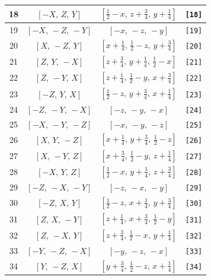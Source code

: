\documentclass[fleqn,8pt]{jsarticle}
\begin{document}
\begin{longtable}{cccc}
18 & $\left[ - X,\, Z,\, Y \right]$ & $\left[ \frac{1}{2} - x,\, z + \frac{3}{4},\, y + \frac{1}{4} \right]$ & {\tt [18]} \\ \hline
19 & $\left[ - X,\, - Z,\, - Y \right]$ & $\left[ - x,\, - z,\, - y \right]$ & {\tt [19]} \\ \hline
20 & $\left[ X,\, - Z,\, Y \right]$ & $\left[ x + \frac{1}{4},\, \frac{1}{2} - z,\, y + \frac{3}{4} \right]$ & {\tt [20]} \\ \hline
21 & $\left[ Z,\, Y,\, - X \right]$ & $\left[ z + \frac{3}{4},\, y + \frac{1}{4},\, \frac{1}{2} - x \right]$ & {\tt [21]} \\ \hline
22 & $\left[ Z,\, - Y,\, X \right]$ & $\left[ z + \frac{1}{4},\, \frac{1}{2} - y,\, x + \frac{3}{4} \right]$ & {\tt [22]} \\ \hline
23 & $\left[ - Z,\, Y,\, X \right]$ & $\left[ \frac{1}{2} - z,\, y + \frac{3}{4},\, x + \frac{1}{4} \right]$ & {\tt [23]} \\ \hline
24 & $\left[ - Z,\, - Y,\, - X \right]$ & $\left[ - z,\, - y,\, - x \right]$ & {\tt [24]} \\ \hline
25 & $\left[ - X,\, - Y,\, - Z \right]$ & $\left[ - x,\, - y,\, - z \right]$ & {\tt [25]} \\ \hline
26 & $\left[ X,\, Y,\, - Z \right]$ & $\left[ x + \frac{1}{4},\, y + \frac{3}{4},\, \frac{1}{2} - z \right]$ & {\tt [26]} \\ \hline
27 & $\left[ X,\, - Y,\, Z \right]$ & $\left[ x + \frac{3}{4},\, \frac{1}{2} - y,\, z + \frac{1}{4} \right]$ & {\tt [27]} \\ \hline
28 & $\left[ - X,\, Y,\, Z \right]$ & $\left[ \frac{1}{2} - x,\, y + \frac{1}{4},\, z + \frac{3}{4} \right]$ & {\tt [28]} \\ \hline
29 & $\left[ - Z,\, - X,\, - Y \right]$ & $\left[ - z,\, - x,\, - y \right]$ & {\tt [29]} \\ \hline
30 & $\left[ - Z,\, X,\, Y \right]$ & $\left[ \frac{1}{2} - z,\, x + \frac{1}{4},\, y + \frac{3}{4} \right]$ & {\tt [30]} \\ \hline
31 & $\left[ Z,\, X,\, - Y \right]$ & $\left[ z + \frac{1}{4},\, x + \frac{3}{4},\, \frac{1}{2} - y \right]$ & {\tt [31]} \\ \hline
32 & $\left[ Z,\, - X,\, Y \right]$ & $\left[ z + \frac{3}{4},\, \frac{1}{2} - x,\, y + \frac{1}{4} \right]$ & {\tt [32]} \\ \hline
33 & $\left[ - Y,\, - Z,\, - X \right]$ & $\left[ - y,\, - z,\, - x \right]$ & {\tt [33]} \\ \hline
34 & $\left[ Y,\, - Z,\, X \right]$ & $\left[ y + \frac{3}{4},\, \frac{1}{2} - z,\, x + \frac{1}{4} \right]$ & {\tt [34]} \\ \hline

\end{longtable}
\end{document}

